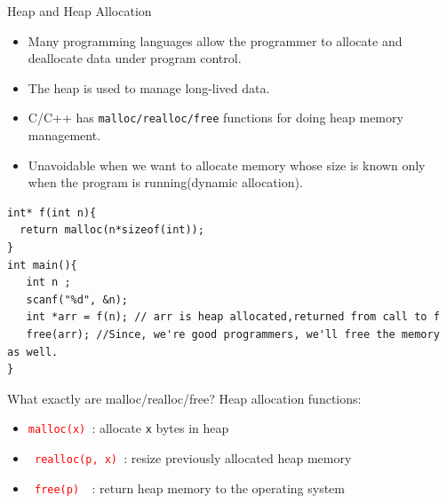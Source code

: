\documentclass[
  10pt,
  ignorenonframetext,
]{beamer}
\newcommand{\passthrough}[1]{#1}
\providecommand{\tightlist}{%
  \setlength{\itemsep}{0pt}\setlength{\parskip}{0pt}}
\begin{document}
\begin{frame}[fragile]{Heap and Heap Allocation}
\protect\hypertarget{heap-and-heap-allocation}{}
\begin{itemize}
\tightlist
\item
  Many programming languages allow the programmer
  to allocate and deallocate data under program
  control.
\end{itemize}

\pause

\begin{itemize}
\tightlist
\item
  The heap is used to manage long-lived data.
\end{itemize}

\pause

\begin{itemize}
\tightlist
\item
  C/C++ has \texttt{malloc/realloc/free} functions
  for doing heap memory management.
\end{itemize}

\pause

\begin{itemize}
\tightlist
\item
  Unavoidable when we want to allocate memory
  whose size is known only when the program is
  running(dynamic allocation).
\end{itemize}

\pause

\scriptsize

\begin{verbatim}
int* f(int n){
  return malloc(n*sizeof(int));
}
int main(){
   int n ;
   scanf("%d", &n);
   int *arr = f(n); // arr is heap allocated,returned from call to f
   free(arr); //Since, we're good programmers, we'll free the memory as well.
}
\end{verbatim}

\normalsize
\end{frame}

\begin{frame}[fragile]{What exactly are
malloc/realloc/free?}
\protect\hypertarget{what-exactly-are-mallocreallocfree}{}
Heap allocation functions:

\begin{itemize}
\tightlist
\item
  \texttt{\textcolor{red}{malloc(x)} }: allocate
  \passthrough{\lstinline!x!} bytes in heap
\end{itemize}

\pause

\begin{itemize}
\tightlist
\item
  \texttt{\textcolor{red}{ realloc(p, x) }}:
  resize previously allocated heap memory
\end{itemize}

\pause

\begin{itemize}
\tightlist
\item
  \texttt{\textcolor{red}{ free(p) } }: return
  heap memory to the operating system
\end{itemize}
\end{frame}
\end{document}
